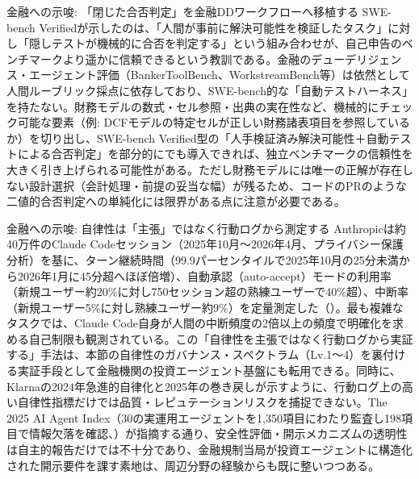 \begin{insight}{金融への示唆: 「閉じた合否判定」を金融DDワークフローへ移植する}
SWE-bench Verifiedが示したのは、「人間が事前に解決可能性を検証したタスク」に対し「隠しテストが機械的に合否を判定する」という組み合わせが、自己申告のベンチマークより遥かに信頼できるという教訓である。金融のデューデリジェンス・エージェント評価（BankerToolBench、WorkstreamBench等）は依然として人間ルーブリック採点に依存しており、SWE-bench的な「自動テストハーネス」を持たない。財務モデルの数式・セル参照・出典の実在性など、機械的にチェック可能な要素（例: DCFモデルの特定セルが正しい財務諸表項目を参照しているか）を切り出し、SWE-bench Verified型の「人手検証済み解決可能性＋自動テストによる合否判定」を部分的にでも導入できれば、独立ベンチマークの信頼性を大きく引き上げられる可能性がある。ただし財務モデルには唯一の正解が存在しない設計選択（会計処理・前提の妥当な幅）が残るため、コードのPRのような二値的合否判定への単純化には限界がある点に注意が必要である。
\end{insight}

\begin{insight}{金融への示唆: 自律性は「主張」ではなく行動ログから測定する}
Anthropicは約40万件のClaude Codeセッション（2025年10月〜2026年4月、プライバシー保護分析）を基に、ターン継続時間（99.9パーセンタイルで2025年10月の25分未満から2026年1月に45分超へほぼ倍増）、自動承認（auto-accept）モードの利用率（新規ユーザー約20\%に対し750セッション超の熟練ユーザーで40\%超）、中断率（新規ユーザー5\%に対し熟練ユーザー約9\%）を定量測定した（\cite{y04anthropicautonomy2026}）。最も複雑なタスクでは、Claude Code自身が人間の中断頻度の2倍以上の頻度で明確化を求める自己制限も観測されている。この「自律性を主張ではなく行動ログから実証する」手法は、本節の自律性のガバナンス・スペクトラム（Lv.1〜4）を裏付ける実証手段として金融機関の投資エージェント基盤にも転用できる。同時に、Klarnaの2024年急進的自律化と2025年の巻き戻しが示すように、行動ログ上の高い自律性指標だけでは品質・レピュテーションリスクを捕捉できない。The 2025 AI Agent Index（30の実運用エージェントを1,350項目にわたり監査し198項目で情報欠落を確認、\cite{y04aiagentindex2025}）が指摘する通り、安全性評価・開示メカニズムの透明性は自主的報告だけでは不十分であり、金融規制当局が投資エージェントに構造化された開示要件を課す素地は、周辺分野の経験からも既に整いつつある。
\end{insight}


